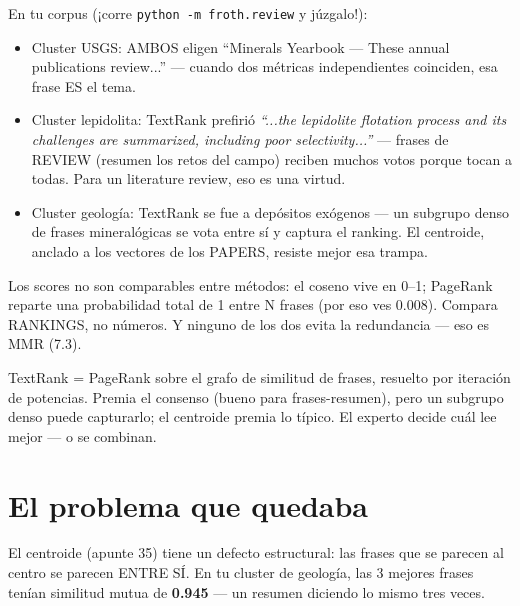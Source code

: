 \documentclass[11pt,a4paper]{article}
\begin{document}
En tu corpus (¡corre \texttt{python -m froth.review} y júzgalo!):

\begin{itemize}
  \item Cluster USGS: AMBOS eligen ``Minerals Yearbook --- These annual publications
        review...'' --- cuando dos métricas independientes coinciden, esa frase ES el tema.
  \item Cluster lepidolita: TextRank prefirió \emph{``...the lepidolite flotation process
        and its challenges are summarized, including poor selectivity...''} --- frases de
        REVIEW (resumen los retos del campo) reciben muchos votos porque tocan a todas.
        Para un literature review, eso es una virtud.
  \item Cluster geología: TextRank se fue a depósitos exógenos --- un subgrupo denso de
        frases mineralógicas se vota entre sí y captura el ranking. El centroide, anclado
        a los vectores de los PAPERS, resiste mejor esa trampa.
\end{itemize}

\begin{ojo}
Los scores no son comparables entre métodos: el coseno vive en 0--1; PageRank reparte una
probabilidad total de 1 entre N frases (por eso ves 0.008). Compara RANKINGS, no números.
Y ninguno de los dos evita la redundancia --- eso es MMR (7.3).
\end{ojo}

\begin{resumen}
TextRank = PageRank sobre el grafo de similitud de frases, resuelto por iteración de
potencias. Premia el consenso (bueno para frases-resumen), pero un subgrupo denso puede
capturarlo; el centroide premia lo típico. El experto decide cuál lee mejor --- o se
combinan.
\end{resumen}
\clearpage
{}
{}

\section{El problema que quedaba}

El centroide (apunte 35) tiene un defecto estructural: las frases que se parecen al
centro se parecen ENTRE SÍ. En tu cluster de geología, las 3 mejores frases tenían
similitud mutua de \textbf{0.945} --- un resumen diciendo lo mismo tres veces.
\end{document}
